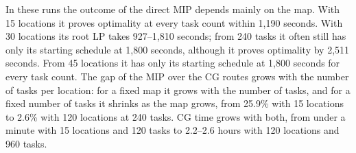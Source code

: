 In these runs the outcome of the direct MIP depends mainly on the map.
With 15 locations it proves optimality at every task count within 1{,}190 seconds.
With 30 locations its root LP takes 927--1{,}810 seconds; from 240 tasks it often still has only its starting schedule at 1{,}800 seconds, although it proves optimality by 2{,}511 seconds.
From 45 locations it has only its starting schedule at 1{,}800 seconds for every task count.
The gap of the MIP over the CG routes grows with the number of tasks per location: for a fixed map it grows with the number of tasks, and for a fixed number of tasks it shrinks as the map grows, from 25.9\% with 15 locations to 2.6\% with 120 locations at 240 tasks.
CG time grows with both, from under a minute with 15 locations and 120 tasks to 2.2--2.6 hours with 120 locations and 960 tasks.
